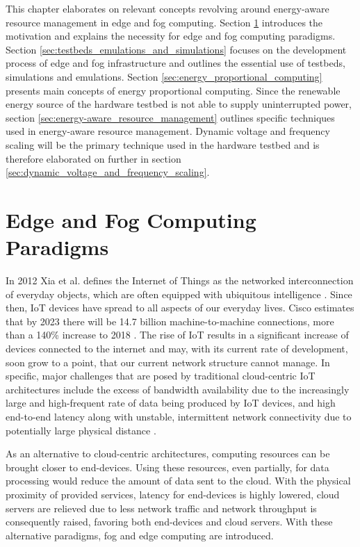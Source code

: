 This chapter elaborates on relevant concepts revolving around energy-aware
resource management in edge and fog computing. Section
\ref{sec:edge_and_fog_computing_paradigms} introduces the motivation and
explains the necessity for edge and fog computing paradigms. Section
\ref{sec:testbeds_emulations_and_simulations}
focuses on the development process of edge and fog infrastructure and outlines
the essential use of testbeds, simulations and emulations. Section
\ref{sec:energy_proportional_computing} presents main concepts of energy
proportional computing. Since the renewable energy source of the hardware
testbed is not able to supply uninterrupted power, section
\ref{sec:energy-aware_resource_management} outlines specific techniques used in
energy-aware resource management. Dynamic voltage and frequency scaling will be
the primary technique used in the hardware testbed and is therefore elaborated
on further in section \ref{sec:dynamic_voltage_and_frequency_scaling}.

\section{Edge and Fog Computing Paradigms}
\label{sec:edge_and_fog_computing_paradigms}

In 2012 Xia et al. defines the Internet of Things as the networked
interconnection of everyday objects, which are often equipped with ubiquitous
intelligence \cite{xia2012}. Since then, IoT devices have spread to all aspects
of our everyday lives. Cisco estimates that by 2023 there will be 14.7 billion
machine-to-machine connections, more than a 140\% increase to 2018
\cite{cisco2020}. The rise of IoT results in a significant increase of devices
connected to the internet and may, with its current rate of development, soon
grow to a point, that our current network structure cannot manage. In specific,
major challenges that are posed by traditional cloud-centric IoT architectures
include the excess of bandwidth availability due to the increasingly large and
high-frequent rate of data being produced by IoT devices, and high end-to-end
latency along with unstable, intermittent network connectivity due to
potentially large physical distance \cite{buyya2019}.

As an alternative to cloud-centric architectures, computing resources can be
brought closer to end-devices. Using these resources, even partially, for data
processing would reduce the amount of data sent to the cloud. With the physical
proximity of provided services, latency for end-devices is highly lowered, cloud
servers are relieved due to less network traffic and network throughput is
consequently raised, favoring both end-devices and cloud servers. With these
alternative paradigms, fog and edge computing are introduced.

